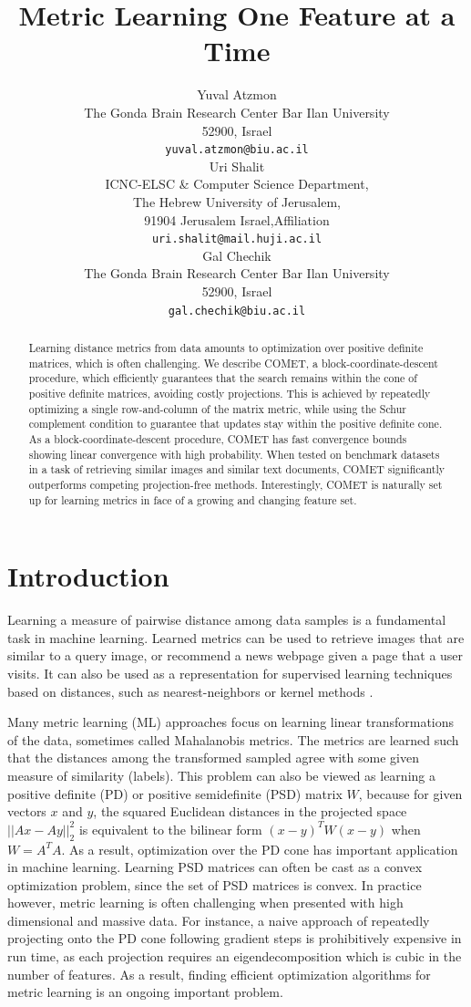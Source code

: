 \documentclass{article} %
\title{Metric Learning One Feature at a Time}
\author{
Yuval Atzmon \\
The Gonda Brain Research Center
Bar Ilan University\\
52900, Israel\\
\texttt{yuval.atzmon@biu.ac.il} \\
\And
Uri Shalit \\
ICNC-ELSC & Computer Science Department, \\
The Hebrew University of Jerusalem, \\
91904 Jerusalem Israel,Affiliation \\
\texttt{uri.shalit@mail.huji.ac.il} \\
\AND
Gal Chechik \\
The Gonda Brain Research Center
Bar Ilan University\\
52900, Israel\\
\texttt{gal.chechik@biu.ac.il}
}
\newcommand\mat[1]{{#1}}
\newcommand{\W}{\mat{W}}
\begin{document}
\maketitle

\begin{abstract} 
Learning distance metrics from data amounts to optimization over positive definite matrices, which is often challenging. We describe COMET, a block-coordinate-descent procedure, which efficiently guarantees that the search remains within the cone of positive definite matrices, avoiding costly projections. 
This is achieved by repeatedly optimizing a single row-and-column of the matrix metric, while using the Schur complement condition to guarantee that updates stay within the positive definite cone. As a block-coordinate-descent procedure, COMET has fast convergence bounds showing linear convergence with high probability. When tested on benchmark datasets in a task of retrieving similar images and similar text documents, COMET significantly outperforms competing projection-free methods. Interestingly, COMET is naturally set up for learning metrics in face of a growing and changing feature set.
\end{abstract} 





\section{Introduction}
Learning a measure of pairwise distance among data samples is a fundamental task in machine learning. Learned metrics can be used to retrieve images that are similar to a query image, or recommend a news webpage given a page that a user visits. It can also be used as a representation for supervised learning techniques based on distances, such as nearest-neighbors or kernel methods \cite{kulis2012survey}. 

Many metric learning (ML) approaches focus on learning linear transformations of the data, sometimes called Mahalanobis metrics. The metrics are learned such that the distances among the transformed sampled agree with some given measure of similarity (labels). This problem can also be viewed as learning a positive definite (PD) or positive semidefinite (PSD) matrix $\W$, because for given vectors $x$ and $y$, the squared Euclidean distances in the projected space $||Ax-Ay||^2_2$ is equivalent to the bilinear form $(x-y)^T\W(x-y)$ when $\W=A^TA$. As a result, optimization over the PD cone has important application in machine learning. 
Learning PSD matrices can often be cast as a convex optimization problem, since the set of PSD matrices is convex. In practice however, metric learning is often challenging when presented with high dimensional and massive data. For instance, a naive approach of repeatedly projecting onto the PD cone following gradient steps is prohibitively expensive in run time, as each projection requires an eigendecomposition which is cubic in the number of features. As a result, finding efficient optimization algorithms for metric learning is an ongoing important problem.
\end{document}
